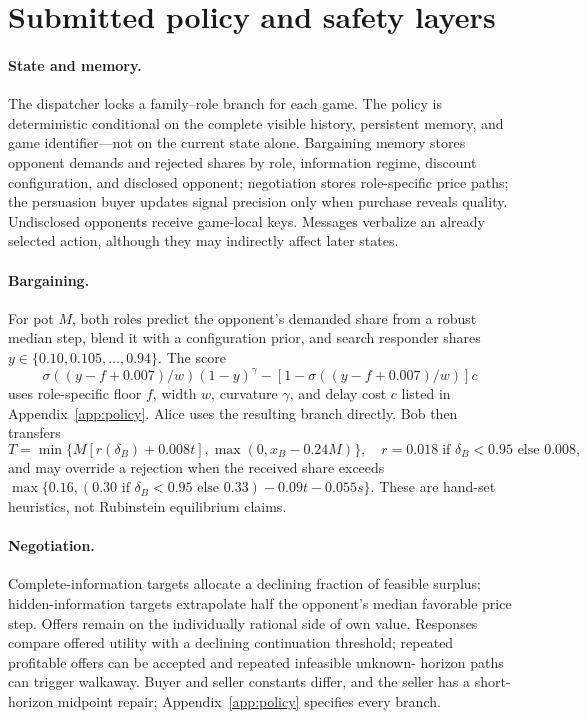 \section{Submitted policy and safety layers}

\paragraph{State and memory.}
The dispatcher locks a family--role branch for each game. The policy is
deterministic conditional on the complete visible history, persistent memory,
and game identifier---not on the current state alone. Bargaining memory stores
opponent demands and rejected shares by role, information regime, discount
configuration, and disclosed opponent; negotiation stores role-specific price
paths; the persuasion buyer updates signal precision only when purchase reveals
quality. Undisclosed opponents receive game-local keys. Messages verbalize an
already selected action, although they may indirectly affect later states.

\paragraph{Bargaining.}
For pot $M$, both roles predict the opponent's demanded share from a robust
median step, blend it with a configuration prior, and search responder shares
$y\in\{0.10,0.105,\ldots,0.94\}$. The score
\begin{equation}
 \sigma((y-f+0.007)/w)(1-y)^\gamma-
 [1-\sigma((y-f+0.007)/w)]c
 \label{eq:bargaining-search}
\end{equation}
uses role-specific floor $f$, width $w$, curvature $\gamma$, and delay cost
$c$ listed in Appendix~\ref{app:policy}. Alice uses the resulting branch
directly. Bob then transfers
\begin{equation}
 T=\min\{M[r(\delta_B)+0.008t],\max(0,x_B-0.24M)\},
 \quad r=0.018\;\text{if }\delta_B<0.95\text{ else }0.008,
 \label{eq:bob-transfer}
\end{equation}
and may override a rejection when the received share exceeds
$\max\{0.16,(0.30\text{ if }\delta_B<0.95\text{ else }0.33)-0.09t-0.055s\}$.
These are hand-set heuristics, not Rubinstein equilibrium claims.

\paragraph{Negotiation.}
Complete-information targets allocate a declining fraction of feasible surplus;
hidden-information targets extrapolate half the opponent's median favorable
price step. Offers remain on the individually rational side of own value.
Responses compare offered utility with a declining continuation threshold;
repeated profitable offers can be accepted and repeated infeasible unknown-
horizon paths can trigger walkaway. Buyer and seller constants differ, and the
seller has a short-horizon midpoint repair; Appendix~\ref{app:policy} specifies
every branch.

